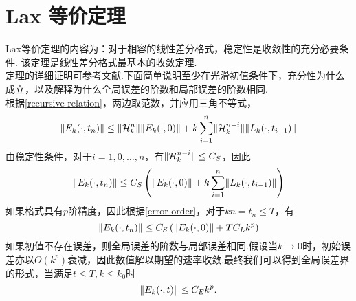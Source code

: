 \section{Lax 等价定理}
Lax等价定理的内容为：对于相容的线性差分格式，稳定性是收敛性的充分必要条件. 该定理是线性差分格式最基本的收敛定理.\\
定理的详细证明可参考文献.下面简单说明至少在光滑初值条件下，充分性为什么成立，以及解释为什么全局误差的阶数和局部误差的阶数相同.\\
根据\eqref{recursive relation}，两边取范数，并应用三角不等式，
\begin{equation}
	\lVert E_k(\cdot,t_n)\rVert \le \lVert\mathcal{H}_k^n\rVert\lVert E_k(\cdot,0)\rVert + k\sum_{i=1}^{n}\lVert\mathcal{H}_k^{n-i}\rVert \lVert L_k(\cdot,t_{i-1})\rVert
\end{equation}
由稳定性条件，对于$i=1,0,\ldots,n$，有$\lVert\mathcal{H}_k^{n-i}\rVert \le C_S$，因此
\begin{equation}
	\lVert E_k(\cdot,t_n)\rVert \le C_S \left(\lVert E_k(\cdot,0)\rVert + k\sum_{i=1}^{n}\lVert L_k(\cdot,t_{i-1})\rVert\right)
\end{equation}
如果格式具有$p$阶精度，因此根据\eqref{error order}，对于$kn=t_n \le T$，有
\begin{equation}
	\lVert E_k(\cdot,t_n)\rVert \le C_S \left(\lVert E_k(\cdot,0)\rVert + TC_L k^p \right)
\end{equation}
如果初值不存在误差，则全局误差的阶数与局部误差相同.假设当$k \to 0$时，初始误差亦以$O(k^p)$衰减，因此数值解以期望的速率收敛.最终我们可以得到全局误差界的形式，当满足$t\le T, k \le k_0$时
\begin{equation}
	\lVert E_k(\cdot,t)\rVert \le C_E k^p.
\end{equation}

